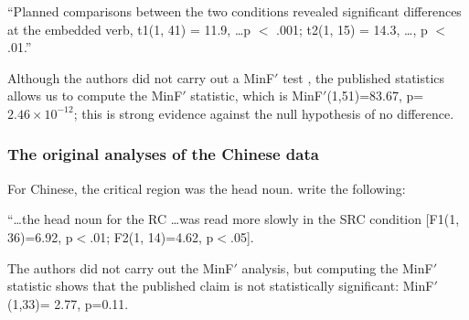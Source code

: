 \documentclass{ar-1col}\usepackage[]{graphicx}\usepackage[]{color}
\begin{document}
\begin{extract}
``Planned comparisons between the two conditions revealed significant differences at the embedded verb, t1(1, 41) = 11.9, \dots p $<$ .001; t2(1, 15) = 14.3, \dots, p $<$ .01.''
\end{extract}

Although the authors did not carry out a MinF$'$ test \citep{clark1973lfe}, the published statistics allows us to compute the MinF$'$ statistic, which is MinF$'$(1,51)=83.67, p=$2.46 \times 10^{-12}$; this is strong evidence against the null hypothesis of no difference.



\subsubsection{The original analyses of the Chinese data}

For Chinese, the critical region was the head noun. \citet{gibsonwu} write the following:

\begin{extract}
``\dots the head noun for the RC \dots was read more slowly in the SRC condition [F1(1, 36)=6.92, p$<$.01; F2(1, 14)=4.62, p$<$.05].
\end{extract}


The authors did not carry out the MinF$'$ analysis, but computing the MinF$'$ statistic shows that the published claim is not statistically significant: MinF$'$(1,33)= 2.77, p=0.11.





\end{document}
